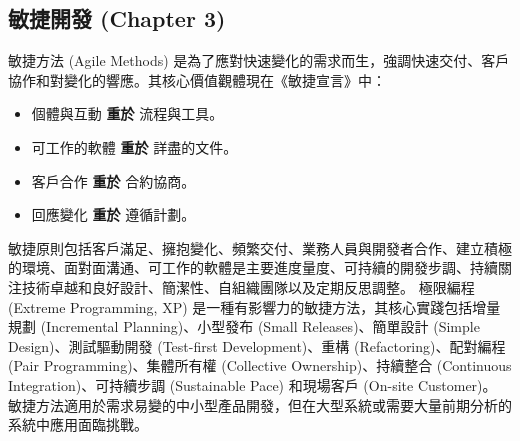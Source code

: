\documentclass[twocolumn,11pt,a4paper]{article}
\begin{document}
\subsection{敏捷開發 (Chapter 3)}
敏捷方法 (Agile Methods) 是為了應對快速變化的需求而生，強調快速交付、客戶協作和對變化的響應。其核心價值觀體現在《敏捷宣言》中：
\begin{itemize}[noitemsep, topsep=0pt]
    \item 個體與互動 \textbf{重於} 流程與工具。
    \item 可工作的軟體 \textbf{重於} 詳盡的文件。
    \item 客戶合作 \textbf{重於} 合約協商。
    \item 回應變化 \textbf{重於} 遵循計劃。
\end{itemize}
敏捷原則包括客戶滿足、擁抱變化、頻繁交付、業務人員與開發者合作、建立積極的環境、面對面溝通、可工作的軟體是主要進度量度、可持續的開發步調、持續關注技術卓越和良好設計、簡潔性、自組織團隊以及定期反思調整。
極限編程 (Extreme Programming, XP) 是一種有影響力的敏捷方法，其核心實踐包括增量規劃 (Incremental Planning)、小型發布 (Small Releases)、簡單設計 (Simple Design)、測試驅動開發 (Test-first Development)、重構 (Refactoring)、配對編程 (Pair Programming)、集體所有權 (Collective Ownership)、持續整合 (Continuous Integration)、可持續步調 (Sustainable Pace) 和現場客戶 (On-site Customer)。
敏捷方法適用於需求易變的中小型產品開發，但在大型系統或需要大量前期分析的系統中應用面臨挑戰。
\end{document}
